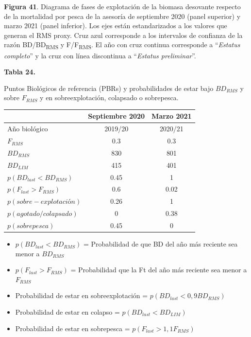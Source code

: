 \documentclass[
  spanish,
]{article}
\providecommand{\tightlist}{%
  \setlength{\itemsep}{0pt}\setlength{\parskip}{0pt}}
\begin{document}
\vspace{-0.3cm}
\footnotesize

\textbf{Figura 41}. Diagrama de fases de explotación de la biomasa
desovante respecto de la mortalidad por pesca de la asesoría de
septiembre 2020 (panel superior) y marzo 2021 (panel inferior). Los ejes
están estandarizados a los valores que generan el RMS proxy. Cruz azul
corresponde a los intervalos de confianza de la razón
BD/BD\textsubscript{RMS} y F/F\textsubscript{RMS}. El año con cruz
continua corresponde a ``\emph{Estatus completo}'' y la cruz con línea
discontinua a ``\emph{Estatus preliminar}''. \vspace{0.5cm} \normalsize

\pagebreak

\small
\begin{center} 
\textbf{Tabla 24.}
\end{center}
\begin{center} 
\vspace{-0.2cm} Puntos Biológicos de referencia (PBRs) y probabilidades de estar bajo $BD_{RMS}$ y sobre $F_{RMS}$ y en sobreexplotación, colapsado o sobrepesca. 
\end{center}
\vspace{-0.2cm}

\begin{longtable}[]{@{}lcc@{}}
\toprule
& Septiembre 2020 & Marzo 2021\tabularnewline
\midrule
\endhead
Año biológico & 2019/20 & 2020/21\tabularnewline
\(F_{RMS}\) & 0.3 & 0.3\tabularnewline
\(BD_{RMS}\) & 830 & 801\tabularnewline
\(BD_{LIM}\) & 415 & 401\tabularnewline
\(p(BD_{last}<BD_{RMS})\) & 0.45 & 1\tabularnewline
\(p(F_{last}>F_{RMS})\) & 0.6 & 0.02\tabularnewline
\(p(sobre-explotación)\) & 0.26 & 1\tabularnewline
\(p(agotado/colapsado)\) & 0 & 0.38\tabularnewline
\(p(sobrepesca)\) & 0.45 & 0\tabularnewline
\bottomrule
\end{longtable}

\vspace{-0.5cm}
\scriptsize

\begin{itemize}
\tightlist
\item
  \(p(BD_{last}<BD_{RMS})\) = Probabilidad de que BD del año más
  reciente sea menor a \(BD_{RMS}\)
\item
  \(p(F_{last}>F_{RMS})\) = Probabilidad que la Ft del año más reciente
  sea menor a \(F_{RMS}\)
\item
  Probabilidad de estar en sobreexplotación =
  \(p(BD_{last}<0,9BD_{RMS})\)
\item
  Probabilidad de estar en colapso = \(p(BD_{last}<BD_{LIM})\)
\item
  Probabilidad de estar en sobrepesca = \(p(F_{last}>1,1F_{RMS})\)
\end{itemize}
\end{document}
